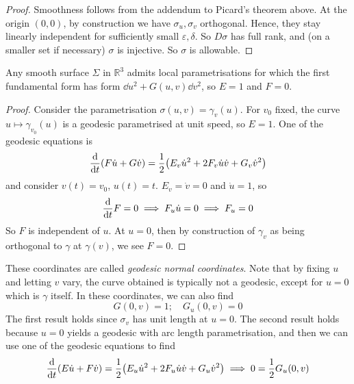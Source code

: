 \begin{proof}
	Smoothness follows from the addendum to Picard's theorem above.
	At the origin \( (0,0) \), by construction we have \( \sigma_u, \sigma_v \) orthogonal.
	Hence, they stay linearly independent for sufficiently small \( \varepsilon, \delta \).
	So \( D\sigma \) has full rank, and (on a smaller set if necessary) \( \sigma \) is injective.
	So \( \sigma \) is allowable.
\end{proof}
\begin{corollary}
	Any smooth surface \( \Sigma \) in \( \mathbb R^3 \) admits local parametrisations for which the first fundamental form has form \( \dd{u}^2 + G(u,v) \dd{v}^2 \), so \( E = 1 \) and \( F = 0 \).
\end{corollary}
\begin{proof}
	Consider the parametrisation \( \sigma(u,v) = \gamma_v(u) \).
	For \( v_0 \) fixed, the curve \( u \mapsto \gamma_{v_0}(u) \) is a geodesic parametrised at unit speed, so \( E = 1 \).
	One of the geodesic equations is
	\[ \dv{t} \qty(F \dot u + G \dot v) = \frac{1}{2} \qty(E_v \dot u^2 + 2F_v \dot u \dot v + G_v \dot v^2) \]
	and consider \( v(t) = v_0 \), \( u(t) = t \).
	\( E_v = \dot v = 0 \) and \( \dot u = 1 \), so
	\[ \dv{t} F = 0 \implies F_u \dot u = 0 \implies F_u = 0 \]
	So \( F \) is independent of \( u \).
	At \( u = 0 \), then by construction of \( \gamma_v \) as being orthogonal to \( \gamma \) at \( \gamma(v) \), we see \( F = 0 \).
\end{proof}
These coordinates are called \textit{geodesic normal coordinates}.
Note that by fixing \( u \) and letting \( v \) vary, the curve obtained is typically not a geodesic, except for \( u = 0 \) which is \( \gamma \) itself.
In these coordinates, we can also find
\[ G(0,v) = 1;\quad G_u(0,v) = 0 \]
The first result holds since \( \sigma_v \) has unit length at \( u = 0 \).
The second result holds because \( u = 0 \) yields a geodesic with arc length parametrisation, and then we can use one of the geodesic equations to find
\[ \dv{t} \qty(E \dot u + F \dot v) = \frac{1}{2}\qty(E_u \dot u^2 + 2F_u \dot u \dot v + G_u \dot v^2) \implies 0 = \frac{1}{2} G_u(0,v) \]

